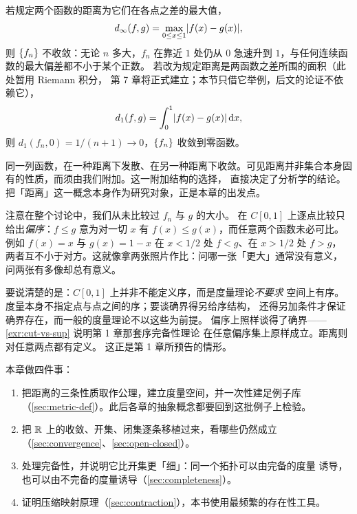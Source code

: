 若规定两个函数的距离为它们在各点之差的最大值，
\begin{equation}
  \label{eq:uniform-metric-intro}
  d_{\infty}(f, g) = \max_{0 \le x \le 1} \lvert f(x) - g(x)\rvert,
\end{equation}
则 \(\{f_{n}\}\) 不收敛：无论 \(n\) 多大，\(f_{n}\) 在靠近 \(1\) 处仍从 \(0\)
急速升到 \(1\)，与任何连续函数的最大偏差都不小于某个正数。
若改为规定距离是两函数之差所围的面积（此处暂用 Riemann 积分，
第 7 章将正式建立；本节只借它举例，后文的论证不依赖它），
\begin{equation}
  \label{eq:l1-metric-intro}
  d_{1}(f, g) = \int_{0}^{1} \lvert f(x) - g(x)\rvert \mathop{}\!\mathrm{d} x,
\end{equation}
则 \(d_{1}(f_{n}, 0) = 1/(n+1) \to 0\)，\(\{f_{n}\}\) 收敛到零函数。

同一列函数，在一种距离下发散、在另一种距离下收敛。可见距离并非集合本身固有的性质，而须由我们附加。这一附加结构的选择，
直接决定了分析学的结论。
把「距离」这一概念本身作为研究对象，正是本章的出发点。

注意在整个讨论中，我们从未比较过 \(f_{n}\) 与 \(g\) 的大小。
在 \(C[0,1]\) 上逐点比较只给出\emph{偏序}：\(f \le g\) 意为对一切 \(x\)
有 \(f(x) \le g(x)\)，而任意两个函数未必可比。例如 \(f(x)=x\) 与
\(g(x)=1-x\) 在 \(x<1/2\) 处 \(f<g\)、在 \(x>1/2\) 处 \(f>g\)，
两者互不小于对方。这就像拿两张照片作比：问哪一张「更大」通常没有意义，
问两张有多像却总有意义。

要说清楚的是：\(C[0,1]\) 上并非不能定义序，而是度量理论\emph{不要求}
空间上有序。度量本身不指定点与点之间的序；要谈确界得另给序结构，
还得另加条件才保证确界存在，而一般的度量理论不以这些为前提。
偏序上照样谈得了确界——\cref{exr:cut-vs-sup} 说明第 1 章那套序完备性理论
在任意偏序集上原样成立。距离则对任意两点都有定义。
这正是第 1 章所预告的情形。

本章做四件事：

\begin{enumerate}[label=(\arabic*)]
  \item 把距离的三条性质取作公理，建立度量空间，并一次性建足例子库
        （\cref{sec:metric-def}）。此后各章的抽象概念都要回到这批例子上检验。
  \item 把 \(\mathbb{R}\) 上的收敛、开集、闭集逐条移植过来，看哪些仍然成立
        （\cref{sec:convergence}、\cref{sec:open-closed}）。
  \item 处理完备性，并说明它比开集更「细」：同一个拓扑可以由完备的度量
        诱导，也可以由不完备的度量诱导（\cref{sec:completeness}）。
  \item 证明压缩映射原理（\cref{sec:contraction}），本书使用最频繁的存在性工具。
\end{enumerate}


